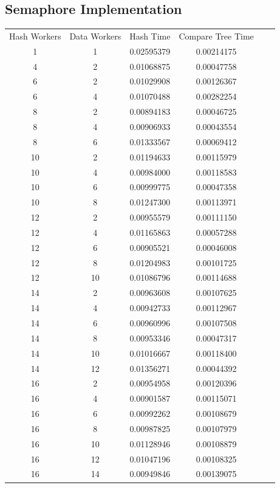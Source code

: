 \documentclass[letterpaper,12pt]{article}
\theoremstyle{remark}
\begin{document}
\subsection*{Semaphore Implementation}
\begin{tabular}{cccccc}

    Hash Workers & Data Workers & Hash Time & Compare Tree Time \\
    1 & 1  & 0.02595379 & 0.00214175  \\
4 & 2 & 0.01068875 & 0.00047758 \\
6 & 2 & 0.01029908 & 0.00126367 \\
6 & 4 & 0.01070488 & 0.00282254 \\
8 & 2 & 0.00894183 & 0.00046725 \\
8 & 4 & 0.00906933 & 0.00043554 \\
8 & 6 & 0.01333567 & 0.00069412 \\
10 & 2 & 0.01194633 & 0.00115979 \\
10 & 4 & 0.00984000 & 0.00118583 \\
10 & 6 & 0.00999775 & 0.00047358 \\
10 & 8 & 0.01247300 & 0.00113971 \\
12 & 2 & 0.00955579 & 0.00111150 \\
12 & 4 & 0.01165863 & 0.00057288 \\
12 & 6 & 0.00905521 & 0.00046008 \\
12 & 8 & 0.01204983 & 0.00101725 \\
12 & 10 & 0.01086796 & 0.00114688 \\
14 & 2 & 0.00963608 & 0.00107625 \\
14 & 4 & 0.00942733 & 0.00112967 \\
14 & 6 & 0.00960996 & 0.00107508 \\
14 & 8 & 0.00953346 & 0.00047317 \\
14 & 10 & 0.01016667 & 0.00118400 \\
14 & 12 & 0.01356271 & 0.00044392 \\
16 & 2 & 0.00954958 & 0.00120396 \\
16 & 4 & 0.00901587 & 0.00115071 \\
16 & 6 & 0.00992262 & 0.00108679 \\
16 & 8 & 0.00987825 & 0.00107979 \\
16 & 10 & 0.01128946 & 0.00108879 \\
16 & 12 & 0.01047196 & 0.00108325 \\
16 & 14 & 0.00949846 & 0.00139075 \\

\end{tabular}
\end{document}
